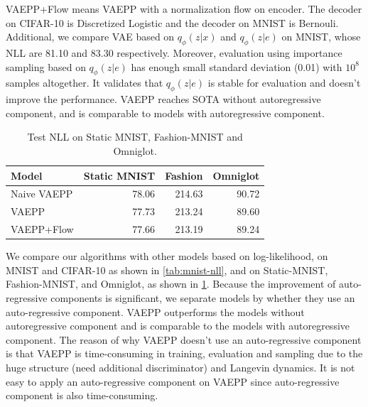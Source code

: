 \begin{table}[tb]
{%
VAEPP+Flow means VAEPP with a normalization flow on encoder. The decoder on CIFAR-10 is Discretized Logistic and the decoder on MNIST is Bernouli. 
Additional, we compare VAE based on $q_\phi(z|x)$ and $q_\phi(z|e)$ on MNIST, whose NLL are 81.10 and 83.30 respectively. Moreover, evaluation using importance sampling based on $q_\phi(z|e)$ has enough small standard deviation (0.01) with $10^8$ samples altogether. It validates that $q_\phi(z|e)$ is stable for evaluation and doesn't improve the performance. VAEPP reaches SOTA without autoregressive component, and is comparable to models with autoregressive component. }
\label{tab:mnist-nll}
\end{table}
\begin{table}[tb]
\centering
\begin{tabular}{lrrr}  
\toprule
Model   & Static MNIST & Fashion & Omniglot \\
\midrule
Naive VAEPP    &   78.06   &  214.63  &   90.72 \\
VAEPP          &   77.73   &  213.24  &   89.60  \\
VAEPP+Flow     &   77.66   &  213.19  &   89.24  \\
\bottomrule
\end{tabular}
\caption{Test NLL on Static MNIST, Fashion-MNIST and Omniglot.  }
\label{tab:cifar-nll}
\end{table}
We compare our algorithms with other models based on log-likelihood, on MNIST and CIFAR-10 as shown in \cref{tab:mnist-nll}, and on Static-MNIST, Fashion-MNIST, and Omniglot, as shown in \cref{tab:cifar-nll}. Because the improvement of auto-regressive components is significant, we separate models by whether they use an auto-regressive component. VAEPP outperforms the models without autoregressive component and is comparable to the models with autoregressive component. The reason of why VAEPP doesn't use an auto-regressive component is that VAEPP is time-consuming in training,  evaluation and sampling due to the huge structure (need additional discriminator) and Langevin dynamics. It is not easy to apply an auto-regressive component on VAEPP since auto-regressive component is also time-consuming. 
